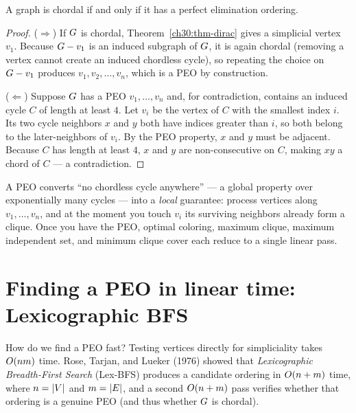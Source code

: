 \begin{theorem}\label{ch30:thm-peo}
A graph is chordal if and only if it has a perfect elimination ordering.
\end{theorem}

\begin{proof}
($\Rightarrow$) If $G$ is chordal, Theorem~\ref{ch30:thm-dirac} gives a simplicial vertex $v_1$. Because $G-v_1$ is an induced subgraph of $G$, it is again chordal (removing a vertex cannot create an induced chordless cycle), so repeating the choice on $G-v_1$ produces $v_1,v_2,\dots,v_n$, which is a PEO by construction.

($\Leftarrow$) Suppose $G$ has a PEO $v_1,\dots,v_n$ and, for contradiction, contains an induced cycle $C$ of length at least $4$. Let $v_i$ be the vertex of $C$ with the smallest index $i$. Its two cycle neighbors $x$ and $y$ both have indices greater than $i$, so both belong to the later-neighbors of $v_i$. By the PEO property, $x$ and $y$ must be adjacent. Because $C$ has length at least $4$, $x$ and $y$ are non-consecutive on $C$, making $xy$ a chord of $C$ --- a contradiction.
\end{proof}

\begin{whybox}
A PEO converts ``no chordless cycle anywhere'' --- a global property over exponentially many cycles --- into a \emph{local} guarantee: process vertices along $v_1,\dots,v_n$, and at the moment you touch $v_i$ its surviving neighbors already form a clique. Once you have the PEO, optimal coloring, maximum clique, maximum independent set, and minimum clique cover each reduce to a single linear pass.
\end{whybox}

\section{Finding a PEO in linear time: Lexicographic BFS}

How do we find a PEO fast? Testing vertices directly for simpliciality takes $O(nm)$ time. Rose, Tarjan, and Lueker (1976) showed that \emph{Lexicographic Breadth-First Search} (Lex-BFS) produces a candidate ordering in $O(n+m)$ time, where $n=\lvert V\rvert$ and $m=\lvert E\rvert$, and a second $O(n+m)$ pass verifies whether that ordering is a genuine PEO (and thus whether $G$ is chordal).

